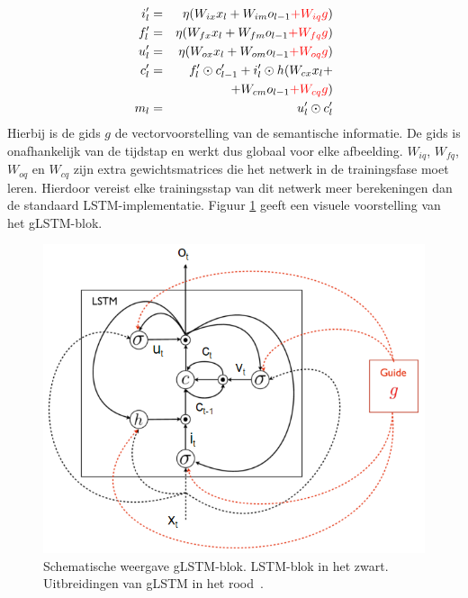 %
\begin{eqnarray}
\vspace{-3mm}
\label{glstm-memory-start}
i_l' & = & \eta (W_{ix} x_l + W_{im} o_{l-1} \color{red}{+ W_{iq} g}\color{black}) \label{glstm-input} \\
f_l' & = & \eta (W_{fx} x_l + W_{fm} o_{l-1} \color{red}{+ W_{fq} g}\color{black}) \\
u_l' & = & \eta (W_{ox} x_l + W_{om} o_{l-1} \color{red}{+ W_{oq} g}\color{black}) \\
c_l' & = & f_l' \odot c_{l-1}' + i_l' \odot h(W_{cx} x_l + \nonumber \\
&   & + W_{cm} o_{l-1} \color{red}{+ W_{cq} g}\color{black}) \\
m_l & = & u_l' \odot c_l'
\label{glstm-memory}
\vspace{-3mm}
\end{eqnarray}
Hierbij is de gids $g$ de vectorvoorstelling van de semantische informatie. De gids is onafhankelijk van de tijdstap en werkt dus globaal voor elke afbeelding. $W_{iq}$, $W_{fq}$, $W_{oq}$ en $W_{cq}$ zijn extra gewichtsmatrices die het netwerk in de trainingsfase moet leren. Hierdoor vereist elke trainingsstap van dit netwerk meer berekeningen dan de standaard LSTM-implementatie. Figuur \ref{fig:glstm} geeft een visuele voorstelling van het gLSTM-blok.

\begin{figure}[tb]
	\centering
	\includegraphics[width=\linewidth]{Images/jia}
	\caption[Schematische weergave gLSTM-blok]{Schematische weergave gLSTM-blok. LSTM-blok in het zwart. Uitbreidingen van gLSTM in het rood~\cite{Fernando2015}.}
	\label{fig:glstm}
\end{figure}

